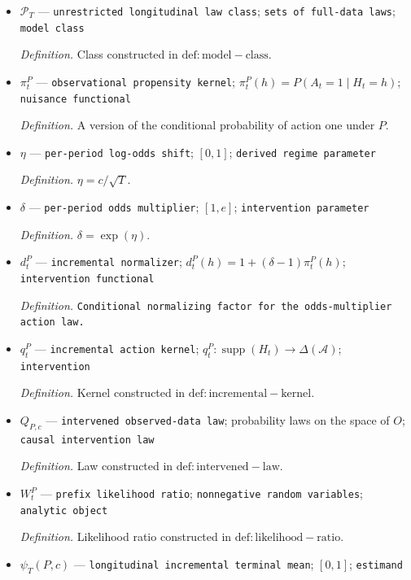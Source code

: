 \documentclass{article}
\begin{document}
\begin{itemize}
  \item \(\mathcal P_T\) --- \texttt{unrestricted longitudinal law class}; \texttt{sets of full-\allowbreak{}data laws}; \texttt{model class}
  \par\smallskip\noindent\emph{Definition.} Class constructed in \(\mathrm{def:model-class}\).
  \item \(\pi_t^P\) --- \texttt{observational propensity kernel}; \(\pi_t^P(h)=P(A_t=1\mid H_t=h)\); \texttt{nuisance functional}
  \par\smallskip\noindent\emph{Definition.} A version of the conditional probability of action one under \(P\).
  \item \(\eta\) --- \texttt{per-\allowbreak{}period log-\allowbreak{}odds shift}; \([0,1]\); \texttt{derived regime parameter}
  \par\smallskip\noindent\emph{Definition.} \(\eta=c/\sqrt T\).
  \item \(\delta\) --- \texttt{per-\allowbreak{}period odds multiplier}; \([1,e]\); \texttt{intervention parameter}
  \par\smallskip\noindent\emph{Definition.} \(\delta=\exp(\eta)\).
  \item \(d_t^P\) --- \texttt{incremental normalizer}; \(d_t^P(h)=1+(\delta-1)\pi_t^P(h)\); \texttt{intervention functional}
  \par\smallskip\noindent\emph{Definition.} \texttt{Conditional normalizing factor for the odds-\allowbreak{}multiplier action law.}
  \item \(q_t^P\) --- \texttt{incremental action kernel}; \(q_t^P:\mathop{\mathrm{supp}}(H_t)\to\Delta(\mathcal A)\); \texttt{intervention}
  \par\smallskip\noindent\emph{Definition.} Kernel constructed in \(\mathrm{def:incremental-kernel}\).
  \item \(Q_{P,c}\) --- \texttt{intervened observed-\allowbreak{}data law}; probability laws on the space of \(O\); \texttt{causal intervention law}
  \par\smallskip\noindent\emph{Definition.} Law constructed in \(\mathrm{def:intervened-law}\).
  \item \(W_t^P\) --- \texttt{prefix likelihood ratio}; \texttt{nonnegative random variables}; \texttt{analytic object}
  \par\smallskip\noindent\emph{Definition.} Likelihood ratio constructed in \(\mathrm{def:likelihood-ratio}\).
  \item \(\psi_T(P,c)\) --- \texttt{longitudinal incremental terminal mean}; \([0,1]\); \texttt{estimand}

\end{itemize}
\end{document}

